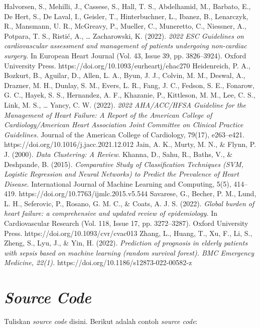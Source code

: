 \documentclass[english,12pt,a4paper,openany]{book}
\begin{document}
\begin{thebibliography}{9}
		Halvorsen, S., Mehilli, J., Cassese, S., Hall, T. S., Abdelhamid, M., Barbato, E., De Hert, S., De Laval, I., Geisler, T., Hinterbuchner, L., Ibanez, B., Lenarczyk, R., Mansmann, U. R., McGreavy, P., Mueller, C., Muneretto, C., Niessner, A., Potpara, T. S., Ristić, A., … Zacharowski, K. (2022). \textit{2022 ESC Guidelines on cardiovascular assessment and management of patients undergoing non-cardiac surgery.} In European Heart Journal (Vol. 43, Issue 39, pp. 3826–3924). Oxford University Press. https://doi.org/10.1093/eurheartj/ehac270
		Heidenreich, P. A., Bozkurt, B., Aguilar, D., Allen, L. A., Byun, J. J., Colvin, M. M., Deswal, A., Drazner, M. H., Dunlay, S. M., Evers, L. R., Fang, J. C., Fedson, S. E., Fonarow, G. C., Hayek, S. S., Hernandez, A. F., Khazanie, P., Kittleson, M. M., Lee, C. S., Link, M. S., … Yancy, C. W. (2022). \textit{2022 AHA/ACC/HFSA Guideline for the Management of Heart Failure: A Report of the American College of Cardiology/American Heart Association Joint Committee on Clinical Practice Guidelines.} Journal of the American College of Cardiology, 79(17), e263–e421. https://doi.org/10.1016/j.jacc.2021.12.012
		Jain, A. K., Murty, M. N., \& Flynn, P. J. (2000). \textit{Data Clustering: A Review}.
		Khanna, D., Sahu, R., Baths, V., \& Deshpande, B. (2015). \textit{Comparative Study of Classification Techniques (SVM, Logistic Regression and Neural Networks) to Predict the Prevalence of Heart Disease}. International Journal of Machine Learning and Computing, 5(5), 414–419. https://doi.org/10.7763/ijmlc.2015.v5.544
		Savarese, G., Becher, P. M., Lund, L. H., Seferovic, P., Rosano, G. M. C., \& Coats, A. J. S. (2022). \textit{Global burden of heart failure: a comprehensive and updated review of epidemiology.} In Cardiovascular Research (Vol. 118, Issue 17, pp. 3272–3287). Oxford University Press. https://doi.org/10.1093/cvr/cvac013
		Zhang, L., Huang, T., Xu, F., Li, S., Zheng, S., Lyu, J., \& Yin, H. (2022). \textit{Prediction of prognosis in elderly patients with sepsis based on machine learning (random survival forest). BMC Emergency Medicine, 22(1).} https://doi.org/10.1186/s12873-022-00582-z
		
	\end{thebibliography}
	
	\appendix
	
	\chapter{\textit{Source Code}}
	Tuliskan \textit{source code} disini. Berikut adalah contoh \textit{source code}:
\end{document}
